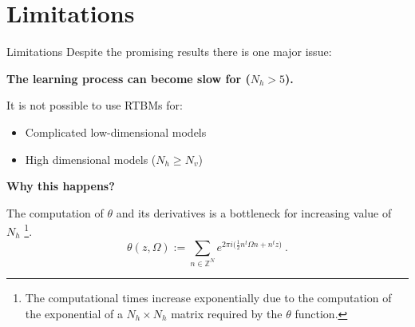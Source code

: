 \documentclass[10pt]{beamer}
\begin{document}
    

\section{Limitations}

\begin{frame}{Limitations}
    Despite the promising results there is one major issue: 
    \begin{center}
        \textbf{The learning process can become slow for ($N_h > 5$).} 
    \end{center}
    It is not possible to use RTBMs for:

    \begin{multicols*}{2}
        \begin{itemize}
            \item Complicated low-dimensional models
            \item High dimensional models ($N_h \geq N_v$)
        \end{itemize}
        
    \end{multicols*}
    
    \begin{center}
        \textbf{Why this happens?}
       
    \end{center}

    The computation of $\theta$ and its derivatives is a bottleneck for increasing value of $N_h$
    \footnote{The computational times increase exponentially due to the computation of
    the exponential of a $N_h \times N_h$ matrix required by the $\theta$ function.}.
    \begin{equation*}
        \theta ( z, \Omega) :=
        \sum_{n \in \mathbb{Z}^N} e^{2 \pi i \big( \frac{1}{2}n^t \Omega n + n^t z \big)} \ .
    \end{equation*}
    


\end{frame}
\end{document}
